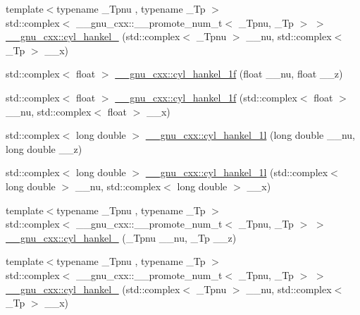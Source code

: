 \begin{DoxyCompactItemize}
\item 
{\footnotesize template$<$typename \+\_\+\+Tpnu , typename \+\_\+\+Tp $>$ }\\std\+::complex$<$ \+\_\+\+\_\+gnu\+\_\+cxx\+::\+\_\+\+\_\+promote\+\_\+num\+\_\+t$<$ \+\_\+\+Tpnu, \+\_\+\+Tp $>$ $>$ \hyperlink{group__gnu__math__spec__func_ga41f7964d4177b4299caf3769271814d2}{\+\_\+\+\_\+gnu\+\_\+cxx\+::cyl\+\_\+hankel\+\_} (std\+::complex$<$ \+\_\+\+Tpnu $>$ \+\_\+\+\_\+nu, std\+::complex$<$ \+\_\+\+Tp $>$ \+\_\+\+\_\+x)
\item 
std\+::complex$<$ float $>$ \hyperlink{group__gnu__math__spec__func_ga89758ed03e56567baa62b90cc4784f71}{\+\_\+\+\_\+gnu\+\_\+cxx\+::cyl\+\_\+hankel\+\_\+1f} (float \+\_\+\+\_\+nu, float \+\_\+\+\_\+z)
\item 
std\+::complex$<$ float $>$ \hyperlink{group__gnu__math__spec__func_ga810e021a3f11c1b2253c15c6f4d41143}{\+\_\+\+\_\+gnu\+\_\+cxx\+::cyl\+\_\+hankel\+\_\+1f} (std\+::complex$<$ float $>$ \+\_\+\+\_\+nu, std\+::complex$<$ float $>$ \+\_\+\+\_\+x)
\item 
std\+::complex$<$ long double $>$ \hyperlink{group__gnu__math__spec__func_gacb49c66b4267fbc56906db02f14365f2}{\+\_\+\+\_\+gnu\+\_\+cxx\+::cyl\+\_\+hankel\+\_\+1l} (long double \+\_\+\+\_\+nu, long double \+\_\+\+\_\+z)
\item 
std\+::complex$<$ long double $>$ \hyperlink{group__gnu__math__spec__func_ga6900f79ec70673bcb001538aec74e07c}{\+\_\+\+\_\+gnu\+\_\+cxx\+::cyl\+\_\+hankel\+\_\+1l} (std\+::complex$<$ long double $>$ \+\_\+\+\_\+nu, std\+::complex$<$ long double $>$ \+\_\+\+\_\+x)
\item 
{\footnotesize template$<$typename \+\_\+\+Tpnu , typename \+\_\+\+Tp $>$ }\\std\+::complex$<$ \+\_\+\+\_\+gnu\+\_\+cxx\+::\+\_\+\+\_\+promote\+\_\+num\+\_\+t$<$ \+\_\+\+Tpnu, \+\_\+\+Tp $>$ $>$ \hyperlink{group__gnu__math__spec__func_ga307fd77aa8f0ed2028a9fab88976ca54}{\+\_\+\+\_\+gnu\+\_\+cxx\+::cyl\+\_\+hankel\+\_} (\+\_\+\+Tpnu \+\_\+\+\_\+nu, \+\_\+\+Tp \+\_\+\+\_\+z)
\item 
{\footnotesize template$<$typename \+\_\+\+Tpnu , typename \+\_\+\+Tp $>$ }\\std\+::complex$<$ \+\_\+\+\_\+gnu\+\_\+cxx\+::\+\_\+\+\_\+promote\+\_\+num\+\_\+t$<$ \+\_\+\+Tpnu, \+\_\+\+Tp $>$ $>$ \hyperlink{group__gnu__math__spec__func_gafb943392dd7cee0114fca8d36cb1318e}{\+\_\+\+\_\+gnu\+\_\+cxx\+::cyl\+\_\+hankel\+\_} (std\+::complex$<$ \+\_\+\+Tpnu $>$ \+\_\+\+\_\+nu, std\+::complex$<$ \+\_\+\+Tp $>$ \+\_\+\+\_\+x)

\end{DoxyCompactItemize}
